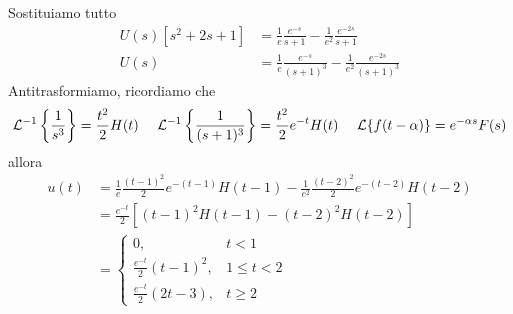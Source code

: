 Sostituiamo tutto
\begin{equation*}
\begin{aligned}
U(s)\left[ s^{2} + 2s + 1\right] & = \frac{1}{e}\frac{e^{- s}}{s + 1} - \frac{1}{e^{2}}\frac{e^{- 2s}}{s + 1}\\
U(s) & = \frac{1}{e}\frac{e^{- s}}{(s + 1)^{3}} - \frac{1}{e^{2}}\frac{e^{- 2s}}{(s + 1)^{3}}
\end{aligned}
\end{equation*}
Antitrasformiamo, ricordiamo che
\begin{equation*}
\Lc^{- 1}\left\{\frac{1}{s^{3}}\right\} = \frac{t^{2}}{2} H(t) \ \ \ \ \Lc^{- 1}\left\{\frac{1}{(s + 1)^{3}}\right\} = \frac{t^{2}}{2} e^{- t} H(t) \ \ \ \ \Lc\{f(t - \alpha)\} = e^{- \alpha s} F(s)
\end{equation*}
allora
\begin{align*}
u(t) & = \frac{1}{e}\frac{(t - 1)^{2}}{2} e^{- (t - 1)} H(t - 1) - \frac{1}{e^{2}}\frac{(t - 2)^{2}}{2} e^{- (t - 2)} H(t - 2)\\
 & = \frac{e^{- t}}{2}\left[(t - 1)^{2} H(t - 1) - (t - 2)^{2} H(t - 2)\right]\\
 & =
\begin{cases}
0, & t < 1\\
\frac{e^{- t}}{2}(t - 1)^{2}, & 1 \leq t < 2\\
\frac{e^{- t}}{2}(2t - 3), & t \geq 2
\end{cases}
\end{align*}
\Soluzione

